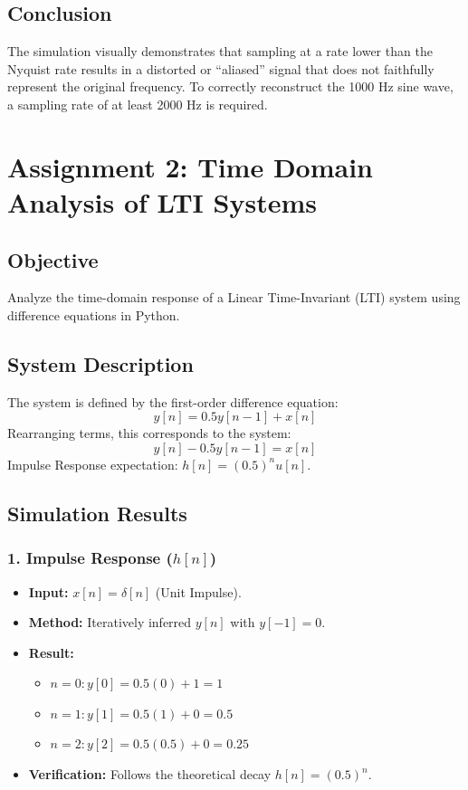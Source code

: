\documentclass[11pt, a4paper]{article}
\begin{document}
\subsection{Conclusion}
The simulation visually demonstrates that sampling at a rate lower than the Nyquist rate results in a distorted or ``aliased'' signal that does not faithfully represent the original frequency. To correctly reconstruct the 1000 Hz sine wave, a sampling rate of at least 2000 Hz is required.

\newpage
\section{Assignment 2: Time Domain Analysis of LTI Systems}
\subsection{Objective}
Analyze the time-domain response of a Linear Time-Invariant (LTI) system using difference equations in Python.

\subsection{System Description}
The system is defined by the first-order difference equation:
$$y[n] = 0.5 y[n-1] + x[n]$$
Rearranging terms, this corresponds to the system:
$$y[n] - 0.5 y[n-1] = x[n]$$
Impulse Response expectation: $h[n] = (0.5)^n u[n]$.

\subsection{Simulation Results}
\subsubsection{1. Impulse Response ($h[n]$)}
\begin{itemize}
    \item \textbf{Input:} $x[n] = \delta[n]$ (Unit Impulse).
    \item \textbf{Method:} Iteratively inferred $y[n]$ with $y[-1]=0$.
    \item \textbf{Result:}
    \begin{itemize}
        \item $n=0: y[0] = 0.5(0) + 1 = 1$
        \item $n=1: y[1] = 0.5(1) + 0 = 0.5$
        \item $n=2: y[2] = 0.5(0.5) + 0 = 0.25$
    \end{itemize}
    \item \textbf{Verification:} Follows the theoretical decay $h[n] = (0.5)^n$.
\end{itemize}
\end{document}
